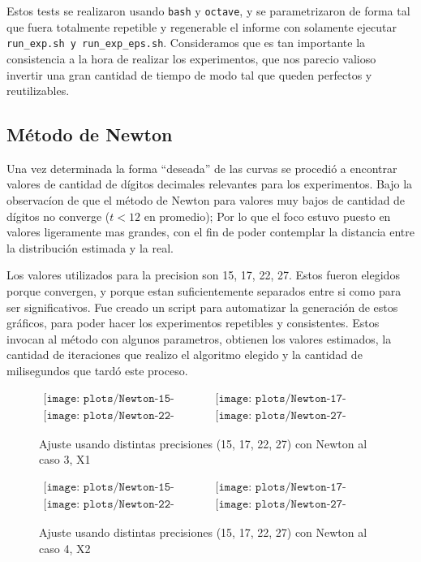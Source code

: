 Estos tests se realizaron usando \texttt{bash} y \texttt{octave}, y se parametrizaron
de forma tal que fuera totalmente repetible y regenerable el informe con solamente
ejecutar \texttt{run\_exp.sh y run\_exp\_eps.sh}. Consideramos que es tan importante
la consistencia a la hora de realizar los experimentos, que nos parecio valioso
invertir una gran cantidad de tiempo de modo tal que queden perfectos y reutilizables.

\subsection{M\'etodo de Newton}

Una vez determinada la forma ``deseada'' de las curvas se procedi\'o a encontrar
valores de cantidad de d\'igitos decimales relevantes para los experimentos. 
Bajo la observac\'ion de que el m\'etodo de Newton para valores muy bajos de 
cantidad de d\'igitos no converge ($t < 12$ en promedio); Por lo que el foco
estuvo puesto en valores ligeramente mas grandes, con el fin de poder contemplar
la distancia entre la distribuci\'on estimada y la real.

Los valores utilizados para la precision son 15, 17, 22, 27. 
Estos fueron elegidos porque convergen, y porque estan suficientemente separados
entre si como para ser significativos. Fue creado un script para automatizar la 
generaci\'on de estos gr\'aficos, para poder hacer los experimentos repetibles 
y consistentes. Estos invocan al m\'etodo con algunos parametros, 
obtienen los valores estimados, la cantidad de iteraciones que realizo el 
algoritmo elegido y la cantidad de milisegundos que tard\'o este proceso.

\begin{figure} [H]
$\begin{array}{cc}
\texttt{[image: plots/Newton-15-caso3.png]} &
\texttt{[image: plots/Newton-17-caso3.png]} \\
\texttt{[image: plots/Newton-22-caso3.png]} &
\texttt{[image: plots/Newton-27-caso3.png]}
\end{array}$
\caption{Ajuste usando distintas precisiones (15, 17, 22, 27) con Newton al caso 3, X1}
\label{fig:FitCaso3Newton}
\end{figure}

\begin{figure} [H]
$\begin{array}{cc}
\texttt{[image: plots/Newton-15-caso4.png]} &
\texttt{[image: plots/Newton-17-caso4.png]} \\
\texttt{[image: plots/Newton-22-caso4.png]} &
\texttt{[image: plots/Newton-27-caso4.png]}
\end{array}$
\caption{Ajuste usando distintas precisiones (15, 17, 22, 27) con Newton al caso 4, X2}
\label{fig:FitCaso4Newton}
\end{figure}


